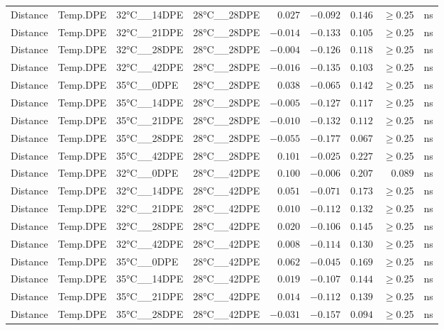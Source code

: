 \documentclass[
]{article}
\begin{document}
\begin{longtable}{llllrrrrl}
Distance & Temp.DPE & 32°C\_\_14DPE & 28°C\_\_28DPE & $0.027$ & $-0.092$ & $0.146$ & $\geq$0.25 & ns \\ 
Distance & Temp.DPE & 32°C\_\_21DPE & 28°C\_\_28DPE & $-0.014$ & $-0.133$ & $0.105$ & $\geq$0.25 & ns \\ 
Distance & Temp.DPE & 32°C\_\_28DPE & 28°C\_\_28DPE & $-0.004$ & $-0.126$ & $0.118$ & $\geq$0.25 & ns \\ 
Distance & Temp.DPE & 32°C\_\_42DPE & 28°C\_\_28DPE & $-0.016$ & $-0.135$ & $0.103$ & $\geq$0.25 & ns \\ 
Distance & Temp.DPE & 35°C\_\_0DPE & 28°C\_\_28DPE & $0.038$ & $-0.065$ & $0.142$ & $\geq$0.25 & ns \\ 
Distance & Temp.DPE & 35°C\_\_14DPE & 28°C\_\_28DPE & $-0.005$ & $-0.127$ & $0.117$ & $\geq$0.25 & ns \\ 
Distance & Temp.DPE & 35°C\_\_21DPE & 28°C\_\_28DPE & $-0.010$ & $-0.132$ & $0.112$ & $\geq$0.25 & ns \\ 
Distance & Temp.DPE & 35°C\_\_28DPE & 28°C\_\_28DPE & $-0.055$ & $-0.177$ & $0.067$ & $\geq$0.25 & ns \\ 
Distance & Temp.DPE & 35°C\_\_42DPE & 28°C\_\_28DPE & $0.101$ & $-0.025$ & $0.227$ & $\geq$0.25 & ns \\ 
Distance & Temp.DPE & 32°C\_\_0DPE & 28°C\_\_42DPE & $0.100$ & $-0.006$ & $0.207$ & $0.089$ & ns \\ 
Distance & Temp.DPE & 32°C\_\_14DPE & 28°C\_\_42DPE & $0.051$ & $-0.071$ & $0.173$ & $\geq$0.25 & ns \\ 
Distance & Temp.DPE & 32°C\_\_21DPE & 28°C\_\_42DPE & $0.010$ & $-0.112$ & $0.132$ & $\geq$0.25 & ns \\ 
Distance & Temp.DPE & 32°C\_\_28DPE & 28°C\_\_42DPE & $0.020$ & $-0.106$ & $0.145$ & $\geq$0.25 & ns \\ 
Distance & Temp.DPE & 32°C\_\_42DPE & 28°C\_\_42DPE & $0.008$ & $-0.114$ & $0.130$ & $\geq$0.25 & ns \\ 
Distance & Temp.DPE & 35°C\_\_0DPE & 28°C\_\_42DPE & $0.062$ & $-0.045$ & $0.169$ & $\geq$0.25 & ns \\ 
Distance & Temp.DPE & 35°C\_\_14DPE & 28°C\_\_42DPE & $0.019$ & $-0.107$ & $0.144$ & $\geq$0.25 & ns \\ 
Distance & Temp.DPE & 35°C\_\_21DPE & 28°C\_\_42DPE & $0.014$ & $-0.112$ & $0.139$ & $\geq$0.25 & ns \\ 
Distance & Temp.DPE & 35°C\_\_28DPE & 28°C\_\_42DPE & $-0.031$ & $-0.157$ & $0.094$ & $\geq$0.25 & ns \\ 

\end{longtable}
\end{document}
